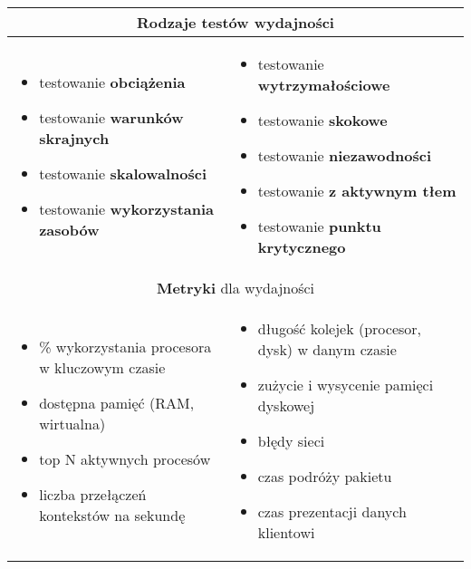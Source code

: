 \documentclass[../main.tex]{subfiles}
\begin{document}
    \begin{table}[H]
        \begin{center}
            \begin{tabular}{| p{8cm} | p{8cm} |}
                \hline
                \multicolumn{2}{|c|}{\textbf{Rodzaje testów} wydajności}\\
                \hline
                \begin{itemize}
                    \item testowanie \textbf{obciążenia}
                    \item testowanie \textbf{warunków skrajnych}
                    \item testowanie \textbf{skalowalności}
                    \item testowanie \textbf{wykorzystania zasobów}
                \end{itemize}
                &
                \begin{itemize}
                    \item testowanie \textbf{wytrzymałościowe}
                    \item testowanie \textbf{skokowe}
                    \item testowanie \textbf{niezawodności}
                    \item testowanie \textbf{z aktywnym tłem}
                    \item testowanie \textbf{punktu krytycznego}
                \end{itemize}\\
                \hline
                \hline
                \multicolumn{2}{|c|}{\textbf{Metryki} dla wydajności}\\
                \hline
                \begin{itemize}
                    \item \% wykorzystania procesora w kluczowym czasie
                    \item dostępna pamięć (RAM, wirtualna)
                    \item top N aktywnych procesów
                    \item liczba przełączeń kontekstów na sekundę
                \end{itemize}
                &
                \begin{itemize}
                    \item długość kolejek (procesor, dysk) w danym czasie
                    \item zużycie i wysycenie pamięci dyskowej
                    \item błędy sieci
                    \item czas podróży pakietu
                    \item czas prezentacji danych klientowi
                \end{itemize}\\
                \hline

            \end{tabular}
        \end{center}
    \end{table}
\end{document}
